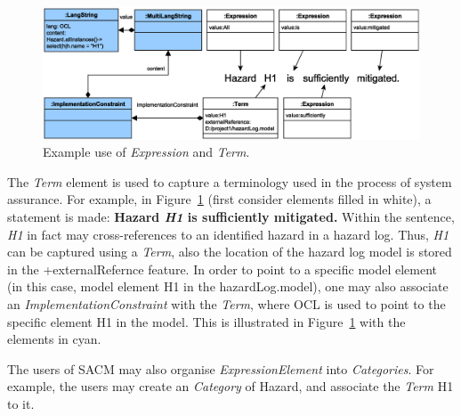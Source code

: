\begin{figure}
	\centering
	\includegraphics[width=1\linewidth]{fig/term.eps}
	\caption{Example use of \textit{Expression} and \textit{Term}.}
	\label{fig:termExample}
\end{figure}

The \textit{Term} element is used to capture a terminology used in the process of system assurance. For example, in Figure~\ref{fig:termExample} (first consider elements filled in white), a statement is made: \textbf{Hazard \textit{H1} is sufficiently mitigated.} Within the sentence, \textit{H1} in fact may cross-references to an identified hazard in a hazard log. Thus, \textit{H1} can be captured using a \textit{Term}, also the location of the hazard log model is stored in the +externalRefernce feature. In order to point to a specific model element (in this case, model element H1 in the hazardLog.model), one may also associate an \textit{ImplementationConstraint} with the \textit{Term}, where OCL is used to point to the specific element H1 in the model. This is illustrated in Figure~\ref{fig:termExample} with the elements in cyan. 

The users of SACM may also organise \textit{ExpressionElement} into \textit{Categories}. For example, the users may create an \textit{Category} of Hazard, and associate the \textit{Term} H1 to it. 
